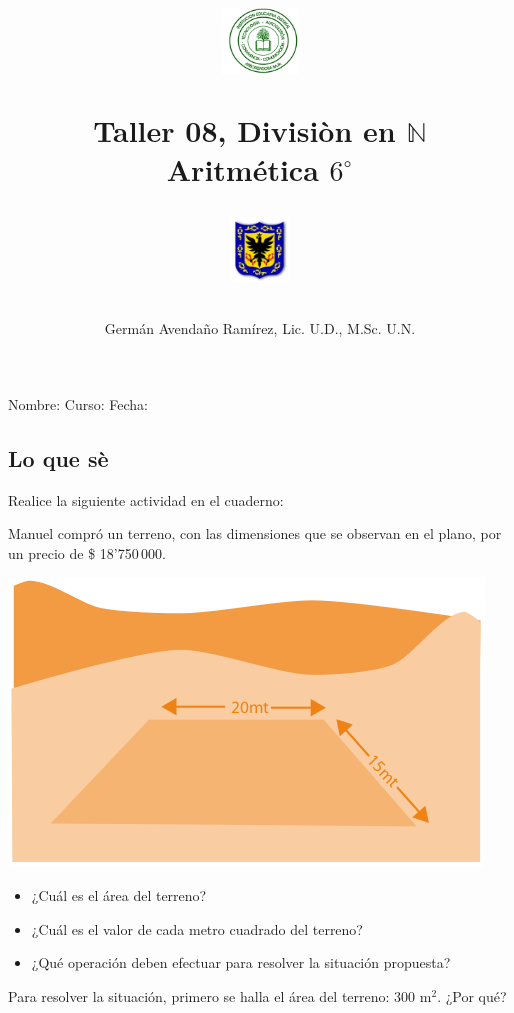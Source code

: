 \documentclass[letterpaper,11pt,twoside]{article}
\author{Germ\'an Avenda\~no Ram\'irez, Lic. U.D., M.Sc. U.N.}
\title{\begin{minipage}{.2\textwidth}
\includegraphics[height=1.75cm]{Images/logo-colegio.png}\end{minipage}
\begin{minipage}{.55\textwidth}
\begin{center}
Taller 08, Divisi\`{o}n en $\mathbb{N}$\\
Aritmética $6^{\circ}$
\end{center}
\end{minipage}\hfill
\begin{minipage}{.2\textwidth}
\includegraphics[height=1.75cm]{Images/logo-sed.png} 
\end{minipage}}
\date{}
\begin{document}
\maketitle
Nombre: \hrulefill Curso: \underline{\hspace*{44pt}} Fecha: \underline{\hspace*{2.5cm}}
\begin{multicols}{2}
\section*{Lo que s\`{e}}
Realice la siguiente actividad en el cuaderno:

Manuel compró un terreno, con las dimensiones que se observan en el plano, por un precio de \$ 18'750\,000.
\begin{center}
\includegraphics[scale=.5]{Images/terreno.png} 
\end{center}
\begin{itemize}
\item ¿Cuál es el área del terreno?
\item ¿Cuál es el valor de cada metro cuadrado del terreno?
\item ¿Qué operación deben efectuar para resolver la situación propuesta?
\end{itemize}
Para resolver la situación, primero se halla el área del terreno: 300 m$^{2}$. ¿Por qué?


\end{multicols}
\end{document}
